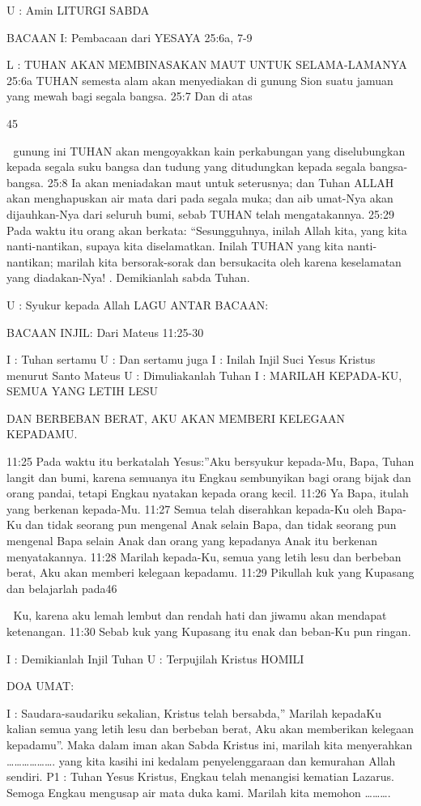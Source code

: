 \documentclass[10pt,a5paper,fancyhdr]{memoir}
\begin{document}
U : Amin 
LITURGI SABDA 

BACAAN I: Pembacaan dari YESAYA 25:6a, 7-9 

L : TUHAN AKAN MEMBINASAKAN MAUT UNTUK 
SELAMA-LAMANYA 
25:6a TUHAN semesta alam akan menyediakan di gunung Sion 
suatu jamuan yang mewah bagi segala bangsa. 25:7 Dan di atas 

45 



gunung ini TUHAN akan mengoyakkan kain perkabungan yang 
diselubungkan kepada segala suku bangsa dan tudung yang 
ditudungkan kepada segala bangsa-bangsa. 25:8 Ia akan meniadakan 
maut untuk seterusnya; dan Tuhan ALLAH akan menghapuskan air 
mata dari pada segala muka; dan aib umat-Nya akan dijauhkan-Nya 
dari seluruh bumi, sebab TUHAN telah mengatakannya. 25:29 Pada 
waktu itu orang akan berkata: “Sesungguhnya, inilah Allah kita, yang 
kita nanti-nantikan, supaya kita diselamatkan. Inilah TUHAN yang 
kita nanti-nantikan; marilah kita bersorak-sorak dan bersukacita oleh 
karena keselamatan yang diadakan-Nya! . Demikianlah sabda Tuhan. 

U : Syukur kepada Allah 
LAGU ANTAR BACAAN: 

BACAAN INJIL: Dari Mateus 11:25-30 

I : Tuhan sertamu 
U : Dan sertamu juga 
I : Inilah Injil Suci Yesus Kristus menurut Santo Mateus 
U : Dimuliakanlah Tuhan 
I : MARILAH KEPADA-KU, SEMUA YANG LETIH LESU 

DAN BERBEBAN BERAT, AKU AKAN MEMBERI KELEGAAN 
KEPADAMU. 

11:25 Pada waktu itu berkatalah Yesus:”Aku bersyukur kepada-Mu, 
Bapa, Tuhan langit dan bumi, karena semuanya itu Engkau 
sembunyikan bagi orang bijak dan orang pandai, tetapi Engkau 
nyatakan kepada orang kecil. 11:26 Ya Bapa, itulah yang berkenan 
kepada-Mu. 11:27 Semua telah diserahkan kepada-Ku oleh Bapa-Ku 
dan tidak seorang pun mengenal Anak selain Bapa, dan tidak seorang 
pun mengenal Bapa selain Anak dan orang yang kepadanya Anak itu 
berkenan menyatakannya. 11:28 Marilah kepada-Ku, semua yang 
letih lesu dan berbeban berat, Aku akan memberi kelegaan 
kepadamu. 11:29 Pikullah kuk yang Kupasang dan belajarlah pada46 



Ku, karena aku lemah lembut dan rendah hati dan jiwamu akan 
mendapat ketenangan. 11:30 Sebab kuk yang Kupasang itu enak dan 
beban-Ku pun ringan. 

I : Demikianlah Injil Tuhan 
U : Terpujilah Kristus 
HOMILI 

DOA UMAT: 

I : Saudara-saudariku sekalian, Kristus telah bersabda,” Marilah 
kepadaKu kalian semua yang letih lesu dan berbeban berat, Aku akan 
memberikan kelegaan kepadamu”. Maka dalam iman akan Sabda 
Kristus ini, marilah kita menyerahkan ………………. yang kita 
kasihi ini kedalam penyelenggaraan dan kemurahan Allah sendiri. 
P1 : Tuhan Yesus Kristus, Engkau telah menangisi kematian 
Lazarus. Semoga Engkau mengusap air mata duka kami. Marilah kita 
memohon ………. 
\end{document}
